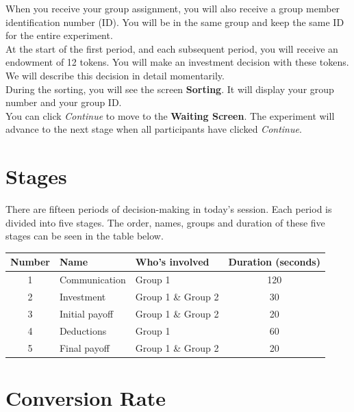 \documentclass[12pt]{article}
\begin{document}
When you receive your group assignment, you will also receive a group member identification number (ID).  You will be in the same group and keep the same ID for the entire experiment.\\

At the start of the first period, and each subsequent period, you will receive an endowment of 12 tokens.  You will make an investment decision with these tokens. We will describe this decision in detail momentarily.\\

During the sorting, you will see the screen {\bf Sorting}. It will display your group number and your group ID.\\

You can click {\em Continue} to move to the {\bf Waiting Screen}.  The experiment will advance to the next stage when all participants have clicked {\em Continue}.



\section*{Stages}
 
There are fifteen periods of decision-making in today's session.  Each period is divided into five stages.  The order, names, groups and duration of these five stages can be seen in the table below. 

\begin{table}[H]
\centering
\begin{tabular}{cllc}
\toprule

{\bf Number} & {\bf Name} & {\bf Who's involved} & {\bf Duration (seconds)}\\
\hline
1 & Communication & Group 1 & 120\\
2 & Investment & Group 1 \& Group 2 & 30\\
3 & Initial payoff & Group 1 \& Group 2 & 20\\
4 & Deductions & Group 1 & 60\\
5 & Final payoff & Group 1 \& Group 2 & 20\\

\bottomrule
\end{tabular}
\end{table}

\section*{Conversion Rate}
\end{document}

